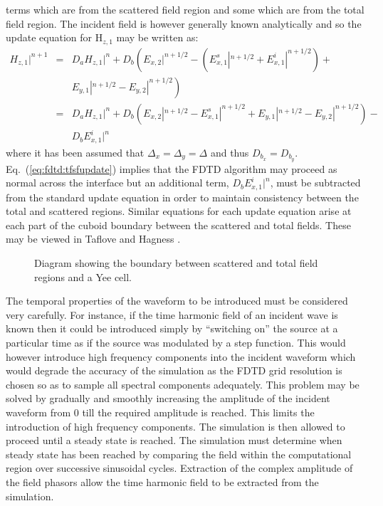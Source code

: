 \documentclass[a4paper, 12pt]{article}
\newcommand{\eq}[1]{Eq.\ (\ref{#1})}
\begin{document}
	terms which are from the scattered field region and some which are
	from the total field region. The incident field is however generally
	known analytically and so the update equation for H$_{z,1}$ may be
	written as:
	\begin{eqnarray}
		H_{z,1}|^{n+1}&=& D_aH_{z,1}|^n+D_b\left(E_{x,2}|^{n+1/2} -
		\left(E_{x,1}^s|^{n+1/2}+E_{x,1}^i|^{n+1/2}\right) + \nonumber\right.\\&&\left.E_{y,1}|^{n+1/2}
		- E_{y,2}|^{n+1/2}\right)\nonumber\\
		&=&D_a H_{z,1}|^n+D_b\left(E_{x,2}|^{n+1/2} -
		E_{x,1}^s|^{n+1/2} + E_{y,1}|^{n+1/2}
		- E_{y,2}|^{n+1/2}\right)-\nonumber\\&&D_bE^i_{x,1}|^n\label{eq:fdtd:tfsfupdate}
	\end{eqnarray}
	where it has been assumed that $\Delta_x=\Delta_y=\Delta$ and thus
	$D_{b_x}=D_{b_y}$. \eq{eq:fdtd:tfsfupdate} implies that the FDTD algorithm may proceed as normal across the
	interface but an additional term, $D_bE^i_{x,1}|^n$, must be
	subtracted from the standard update equation in order to maintain
	consistency between the total and scattered regions. Similar equations
	for each update equation arise at each part of the cuboid boundary
	between the scattered and total fields. These may be viewed in Taflove
	and Hagness \cite{taflove00book}.
	\begin{figure}[!h]
		\centering
		\caption{Diagram showing the boundary between scattered and total
			field regions and a Yee cell.}
		\label{fig:fdtd:tfsfeg}
	\end{figure}

	The temporal properties of the waveform to be introduced must be
	considered very carefully. For instance, if the time harmonic field of
	an incident wave is known then it could be introduced simply by
	``switching on'' the source at a particular time as if the source was
	modulated by a step function. This would however introduce high
	frequency components into the incident waveform which would degrade
	the accuracy of the simulation as the FDTD grid resolution is chosen
	so as to sample all spectral components adequately. This problem may
	be solved by gradually and smoothly increasing the amplitude of the
	incident waveform from 0 till the required amplitude is reached. This
	limits the introduction of high frequency components. The simulation is then
	allowed to proceed until a steady state is reached. The simulation
	must determine when steady state has been reached by comparing the
	field within the computational region over successive sinusoidal
	cycles. Extraction of the complex amplitude of the field phasors allow
	the time harmonic field to be extracted from the simulation.
\end{document}
